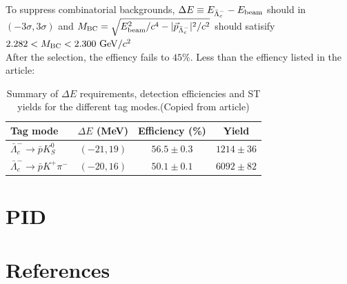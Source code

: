 \documentclass{beamer}
\begin{document}
\begin{frame}
    To suppress combinatorial backgrounds, $\Delta E \equiv E_{\bar{\Lambda}_c^-} -E_{\rm beam}$ should in $(-3\sigma,3\sigma)$ and $M_{\rm BC}=\sqrt{E_{\rm beam}^2/c^4-|\vec{p}_{\bar{\Lambda}_c^-}|^2/c^2}$ should satisify $2.282 <M_{\rm BC}<2.300~{\rm GeV}/c^2$\\
    \vspace{0.2in}
    After the selection, the effiency fails to $45\%$. Less than the effiency listed in the article:
    \begin{table}[ht]
        \centering
        \caption{ Summary of $\Delta E$  requirements, detection efficiencies and  ST yields for the different tag modes.(Copied from article)}
        \begin{tabular}{lccc}
        \hline
        \hline
        Tag {mode} & $\Delta E$ (MeV) & Efficiency (\%) & Yield\\
        \hline
        $\bar{\Lambda}_c^- \rightarrow \bar{p} K^0_S    $ & $(-21, 19)$ & $56.5\pm0.3$ & $1214\pm36$  \\
        $\bar{\Lambda}_c^- \rightarrow \bar{p} K^+ \pi^-$ & $(-20, 16)$ & $50.1\pm0.1$ & $6092\pm82$  \\
        \hline
        \hline
        \end{tabular}
        \label{table: summary of ST data}
    \end{table}
\end{frame}

\section{PID}
\begin{frame}
    
\end{frame}

\section{References}
\begin{frame}[allowframebreaks]
    
\end{frame}
\end{document}
